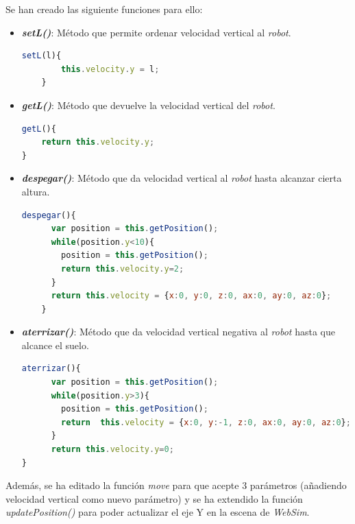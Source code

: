 Se han creado las siguiente funciones para ello:
\begin{itemize}
    \item \textit{\textbf{setL()}}: Método que permite ordenar velocidad vertical al \textit{robot}. 
    
    \begin{lstlisting}[language=javascript]
    setL(l){
        this.velocity.y = l;
    }
    \end{lstlisting}
    
    \item \textit{\textbf{getL()}}: Método que devuelve la velocidad vertical del \textit{robot}.
    
    \begin{lstlisting}[language=javascript]
getL(){
    return this.velocity.y;
}
    \end{lstlisting}
    
    \item \textit{\textit{\textbf{despegar()}}}: Método que da velocidad vertical al \textit{robot} hasta alcanzar cierta altura.
    
    
    \begin{lstlisting}[language=javascript]
  despegar(){
      var position = this.getPosition();
      while(position.y<10){
        position = this.getPosition();
        return this.velocity.y=2;
      }
      return this.velocity = {x:0, y:0, z:0, ax:0, ay:0, az:0};
    }
    \end{lstlisting}
    
    \item \textit{\textbf{aterrizar()}}: Método que da velocidad vertical negativa al \textit{robot} hasta que alcance el suelo. 
    
    \begin{lstlisting}[language=javascript]
 aterrizar(){
      var position = this.getPosition();
      while(position.y>3){
        position = this.getPosition();
        return  this.velocity = {x:0, y:-1, z:0, ax:0, ay:0, az:0};
      }
      return this.velocity.y=0;
}
    \end{lstlisting}
    
\end{itemize}

Además, se ha editado la función \textit{move} para que acepte 3 parámetros (añadiendo velocidad vertical como nuevo parámetro) y se ha extendido la función \textit{updatePosition()} para poder actualizar el eje Y en la escena de \textit{WebSim}.


